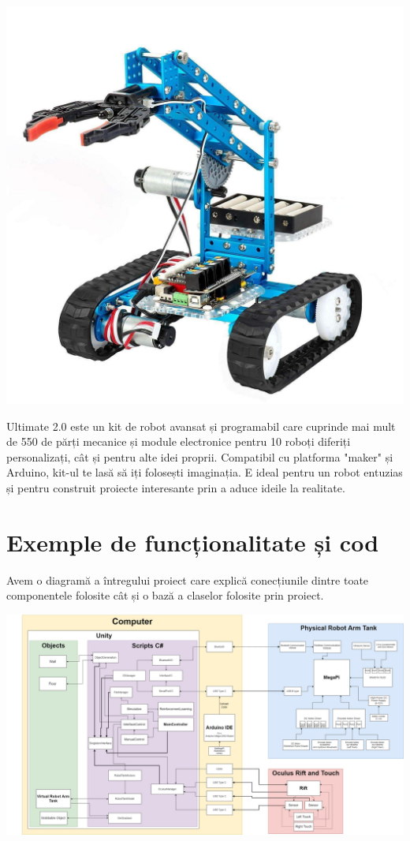 \documentclass[12pt,a4paper]{article}
\begin{document}
	\begin{center}
		\includegraphics[scale=0.15]{robot.jpg}
	\end{center}
	
	\par Ultimate 2.0 este un kit de robot avansat și programabil care cuprinde mai mult de 550 de părți mecanice și module electronice pentru 10 roboți diferiți personalizați, cât și pentru alte idei proprii. Compatibil cu platforma "maker" și Arduino, kit-ul te lasă să iți folosești imaginația. E ideal pentru un robot entuzias și pentru construit proiecte interesante prin a aduce ideile la realitate.
	
	\section{Exemple de funcționalitate și cod}
	
	\par Avem o diagramă a întregului proiect care explică conecțiunile dintre toate componentele folosite cât și o bază a claselor folosite prin proiect. 
	
	\begin{center}
		\includegraphics[scale=0.15]{diagram.jpg}
	\end{center}
	
\end{document}
